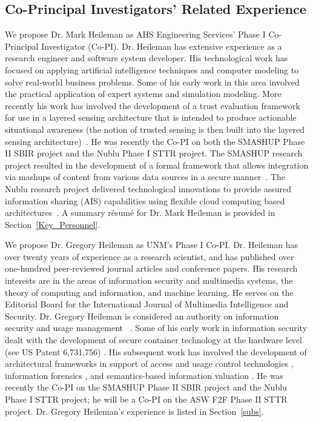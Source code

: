 \documentclass{sbir}
\begin{document}
\subsection{Co-Principal Investigators' Related Experience}
We propose Dr. Mark Heileman as AHS Engineering Services' Phase I Co-Principal Investigator (Co-PI). Dr. Heileman has extensive experience as a research engineer and software system developer. His technological work has focused on applying artificial intelligence techniques and computer modeling to solve real-world business problems. Some of his early work in this area involved the practical application of expert systems and simulation modeling. More recently his work has involved the development of a trust evaluation framework for use in a layered sensing architecture that is intended to produce actionable situational awareness (the notion of trusted sensing is then built into the layered sensing architecture)~\cite{HeHeFiSt:09,HeHeHw:09}. He was recently the Co-PI on both the SMASHUP Phase II SBIR project and the Nublu Phase I STTR project. The SMASHUP research project resulted in the development of a formal framework that allows integration via mashups of content from various data sources in a secure manner~\cite{HeHeGiEv:10,HeHeShGiJa:11}. The Nublu research project delivered technological innovations to provide assured information sharing (AIS) capabilities using flexible cloud computing based architectures~\cite{HeHeNaLa:12}. A summary r\'esum\'e for Dr. Mark Heileman is provided in Section~\ref{Key_Personnel}.

We propose Dr. Gregory Heileman as UNM's Phase I Co-PI. Dr. Heileman has over twenty years of experience as a research scientist, and has published over one-hundred peer-reviewed journal articles and conference papers. His research interests are in the areas of information security and multimedia systems, the theory of computing and information, and machine learning. He serves on the Editorial Board for the International Journal of Multimedia Intelligence and Security. Dr. Gregory Heileman is considered an authority on information security and usage management ~\cite{Informatics}. Some of his early work in information security dealt with the development of secure container technology at the hardware level (see US Patent 6,731,756) \cite{PiHe:04}. His subsequent work has involved the development of architectural frameworks in support of access and usage control technologies \cite{HeJa:05,HeJaKhHr:07,JaHe:04,JaHeMa:06}, information forensics \cite{PeHeAb:07,QuPeHe:09}, and semantics-based information valuation \cite{AlHe:10,AlHe:08}. He was recently the Co-PI on the SMASHUP Phase II SBIR project and the Nublu Phase I STTR project; he will be a Co-PI on the ASW F2F Phase II STTR project. Dr. Gregory Heileman's experience is listed in Section~\ref{subs}.
\end{document}
